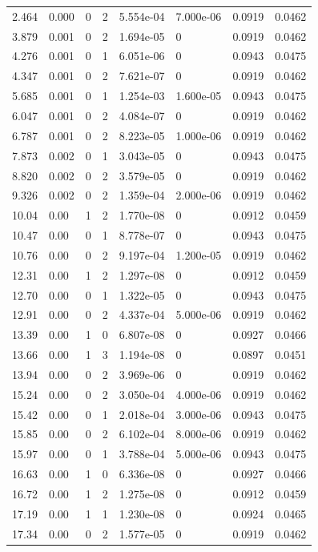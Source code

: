\documentclass[preview]{standalone}
\begin{document}
{{\begin{tabular}{L{1.2cm}C{1.2cm} C{0.3cm}C{0.5cm} C{1.4cm}C{1.4cm} C{1.4cm}C{1.4cm}}
  2.464  &  0.000  & 0     &  2 &  5.554e-04  & 7.000e-06  & 0.0919 &  0.0462   \\ 
  3.879  &  0.001  & 0     &  2 &  1.694e-05  & 0  & 0.0919 &  0.0462   \\ 
  4.276  &  0.001  & 0     &  1 &  6.051e-06  & 0  & 0.0943 &  0.0475   \\ 
  4.347  &  0.001  & 0     &  2 &  7.621e-07  & 0  & 0.0919 &  0.0462   \\ 
  5.685  &  0.001  & 0     &  1 &  1.254e-03  & 1.600e-05  & 0.0943 &  0.0475   \\ 
  6.047  &  0.001  & 0     &  2 &  4.084e-07  & 0  & 0.0919 &  0.0462   \\ 
  6.787  &  0.001  & 0     &  2 &  8.223e-05  & 1.000e-06  & 0.0919 &  0.0462   \\ 
  7.873  &  0.002  & 0     &  1 &  3.043e-05  & 0  & 0.0943 &  0.0475   \\ 
  8.820  &  0.002  & 0     &  2 &  3.579e-05  & 0  & 0.0919 &  0.0462   \\ 
  9.326  &  0.002  & 0     &  2 &  1.359e-04  & 2.000e-06  & 0.0919 &  0.0462   \\ 
  10.04  &  0.00  & 1     &  2 &  1.770e-08  & 0  & 0.0912 &  0.0459   \\ 
  10.47  &  0.00  & 0     &  1 &  8.778e-07  & 0  & 0.0943 &  0.0475   \\ 
  10.76  &  0.00  & 0     &  2 &  9.197e-04  & 1.200e-05  & 0.0919 &  0.0462   \\ 
  12.31  &  0.00  & 1     &  2 &  1.297e-08  & 0  & 0.0912 &  0.0459   \\ 
  12.70  &  0.00  & 0     &  1 &  1.322e-05  & 0  & 0.0943 &  0.0475   \\ 
  12.91  &  0.00  & 0     &  2 &  4.337e-04  & 5.000e-06  & 0.0919 &  0.0462   \\ 
  13.39  &  0.00  & 1     &  0 &  6.807e-08  & 0  & 0.0927 &  0.0466   \\ 
  13.66  &  0.00  & 1     &  3 &  1.194e-08  & 0  & 0.0897 &  0.0451   \\ 
  13.94  &  0.00  & 0     &  2 &  3.969e-06  & 0  & 0.0919 &  0.0462   \\ 
  15.24  &  0.00  & 0     &  2 &  3.050e-04  & 4.000e-06  & 0.0919 &  0.0462   \\ 
  15.42  &  0.00  & 0     &  1 &  2.018e-04  & 3.000e-06  & 0.0943 &  0.0475   \\ 
  15.85  &  0.00  & 0     &  2 &  6.102e-04  & 8.000e-06  & 0.0919 &  0.0462   \\ 
  15.97  &  0.00  & 0     &  1 &  3.788e-04  & 5.000e-06  & 0.0943 &  0.0475   \\ 
  16.63  &  0.00  & 1     &  0 &  6.336e-08  & 0  & 0.0927 &  0.0466   \\ 
  16.72  &  0.00  & 1     &  2 &  1.275e-08  & 0  & 0.0912 &  0.0459   \\ 
  17.19  &  0.00  & 1     &  1 &  1.230e-08  & 0  & 0.0924 &  0.0465   \\ 
  17.34  &  0.00  & 0     &  2 &  1.577e-05  & 0  & 0.0919 &  0.0462   \\ 
\hline 
\end{tabular} 

}}
\end{document}
